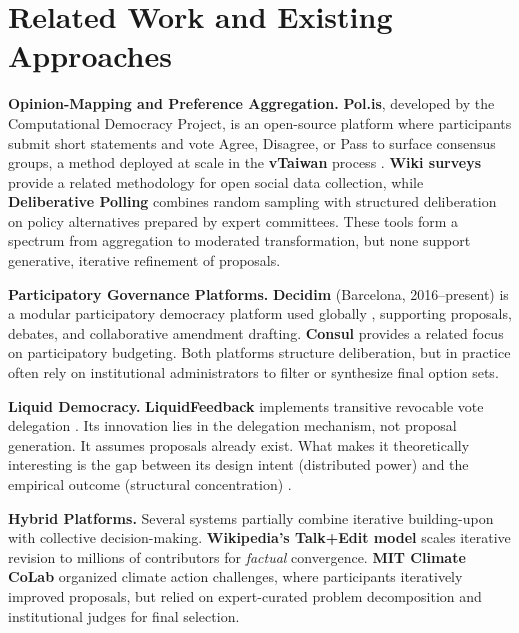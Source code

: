 \documentclass[a4paper, 12pt, twoside]{iviathesis}
\begin{document}
\section{Related Work and Existing Approaches}

\textbf{Opinion-Mapping and Preference Aggregation.} \textbf{Pol.is}, developed by the Computational Democracy Project, is an open-source platform where participants submit short statements and vote Agree, Disagree, or Pass to surface consensus groups, a method deployed at scale in the \textbf{vTaiwan} process \cite{hsiao2018vtaiwan}. \textbf{Wiki surveys} \cite{salganik2015wikisurveys} provide a related methodology for open social data collection, while \textbf{Deliberative Polling} \cite{fishkin2018democracy} combines random sampling with structured deliberation on policy alternatives prepared by expert committees. These tools form a spectrum from aggregation to moderated transformation, but none support generative, iterative refinement of proposals.

\textbf{Participatory Governance Platforms.} \textbf{Decidim} (Barcelona, 2016--present) is a modular participatory democracy platform used globally \cite{barandiaran2024decidim}, supporting proposals, debates, and collaborative amendment drafting. \textbf{Consul} provides a related focus on participatory budgeting. Both platforms structure deliberation, but in practice often rely on institutional administrators to filter or synthesize final option sets.

\textbf{Liquid Democracy.} \textbf{LiquidFeedback} implements transitive revocable vote delegation \cite{behrens2014liquidfeedback}. Its innovation lies in the delegation mechanism, not proposal generation. It assumes proposals already exist. What makes it theoretically interesting is the gap between its design intent (distributed power) and the empirical outcome (structural concentration) \cite{kling2015liquidfeedback}.

\textbf{Hybrid Platforms.} Several systems partially combine iterative building-upon with collective decision-making. \textbf{Wikipedia's Talk+Edit model} scales iterative revision to millions of contributors for \textit{factual} convergence. \textbf{MIT Climate CoLab} \cite{malone2017contest} organized climate action challenges, where participants iteratively improved proposals, but relied on expert-curated problem decomposition and institutional judges for final selection.
\end{document}

